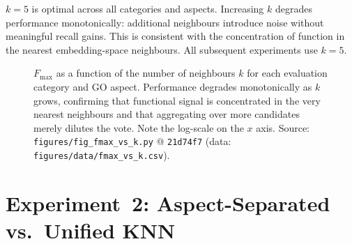 \begin{table}[htbp]
  \centering
  \caption[Fmax vs.\ number of neighbours k]{$F_{\max}$ vs.\ number of neighbours $k$.}
  \label{tab:results-k-sweep}
\end{table}

$k{=}5$ is optimal across all categories and aspects. Increasing $k$ degrades
performance monotonically: additional neighbours introduce noise without
meaningful recall gains. This is consistent with the concentration of function
in the nearest embedding-space neighbours. All subsequent experiments use
$k{=}5$.

\begin{figure}[htbp]
  \centering
  
  \caption[Fmax as a function of k]{%
    $F_{\max}$ as a function of the number of neighbours $k$ for each evaluation
    category and GO aspect. Performance degrades monotonically as $k$ grows,
    confirming that functional signal is concentrated in the very nearest
    neighbours and that aggregating over more candidates merely dilutes the vote.
    Note the log-scale on the $x$ axis.
    Source: \texttt{figures/fig\_fmax\_vs\_k.py} @ \texttt{21d74f7}
    (data: \texttt{figures/data/fmax\_vs\_k.csv}).%
  }
  \label{fig:fmax-vs-k}
\end{figure}

\section{Experiment~2: Aspect-Separated vs.\ Unified KNN}
\label{subsec:exp2-aspect}

